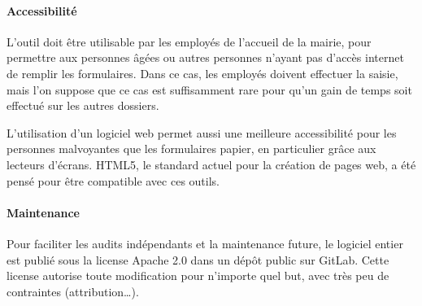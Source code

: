 \paragraph{Accessibilité}
L'outil doit être utilisable par les employés de l'accueil de la mairie, pour permettre aux personnes âgées ou autres personnes n'ayant pas d'accès internet de remplir les formulaires.
Dans ce cas, les employés doivent effectuer la saisie, mais l'on suppose que ce cas est suffisamment rare pour qu'un gain de temps soit effectué sur les autres dossiers.

L'utilisation d'un logiciel web permet aussi une meilleure accessibilité pour les personnes malvoyantes que les formulaires papier, en particulier grâce aux lecteurs d'écrans.
HTML5, le standard actuel pour la création de pages web, a été pensé pour être compatible avec ces outils.

\paragraph{Maintenance}
Pour faciliter les audits indépendants et la maintenance future, le logiciel entier est publié sous la license Apache 2.0 dans un dépôt public sur GitLab.
Cette license autorise toute modification pour n'importe quel but, avec très peu de contraintes (attribution…).
